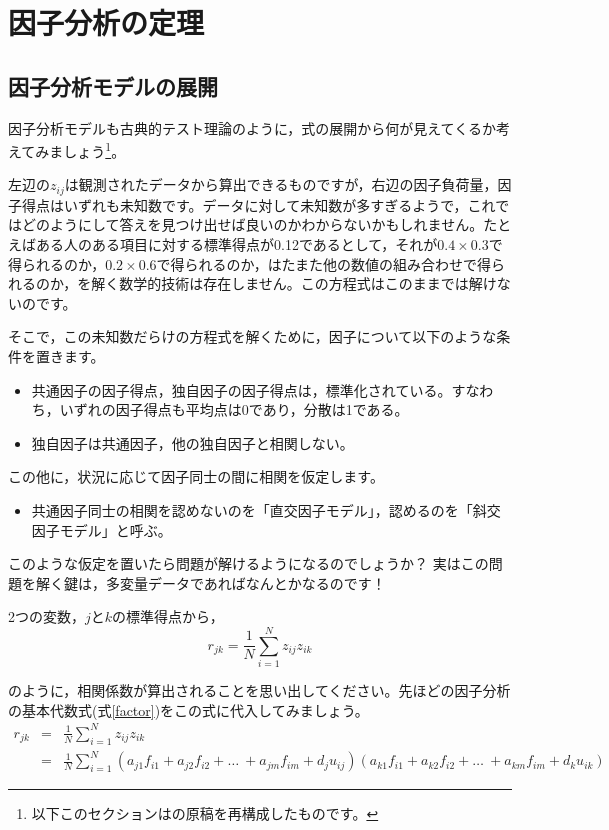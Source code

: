 \documentclass{ltjsbook}
\begin{document}
\section{因子分析の定理}
\subsection{因子分析モデルの展開}
因子分析モデルも古典的テスト理論のように，式の展開から何が見えてくるか考えてみましょう\footnote{以下このセクションは\textcite{kosugi2018}の原稿を再構成したものです。}。

左辺の$z_{ij}$は観測されたデータから算出できるものですが，右辺の因子負荷量，因子得点はいずれも未知数です。データに対して未知数が多すぎるようで，これではどのようにして答えを見つけ出せば良いのかわからないかもしれません。たとえばある人のある項目に対する標準得点が0.12であるとして，それが$0.4 \times 0.3$で得られるのか，$0.2 \times 0.6$で得られるのか，はたまた他の数値の組み合わせで得られるのか，を解く数学的技術は存在しません。この方程式はこのままでは解けないのです。

そこで，この未知数だらけの方程式を解くために，因子について以下のような条件を置きます。
\begin{itemize}
	\item 共通因子の因子得点，独自因子の因子得点は，標準化されている。すなわち，いずれの因子得点も平均点は0であり，分散は1である。
	\item 独自因子は共通因子，他の独自因子と相関しない。
\end{itemize}
この他に，状況に応じて因子同士の間に相関を仮定します。
\begin{itemize}
	\item 共通因子同士の相関を認めないのを「直交因子モデル」，認めるのを「斜交因子モデル」と呼ぶ。
\end{itemize}

このような仮定を置いたら問題が解けるようになるのでしょうか？ 実はこの問題を解く鍵は，多変量データであればなんとかなるのです！

2つの変数，$j$と$k$の標準得点から，
\begin{equation}
	r_{jk}=\frac{1}{N} \sum_{i=1}^{N} z_{ij}z_{ik}
\end{equation}

のように，相関係数が算出されることを思い出してください。先ほどの因子分析の基本代数式(式\ref{factor})をこの式に代入してみましょう。
\begin{equation}
	\begin{array}{ccl}
		r_{jk} & = & \displaystyle{\frac{1}{N} \sum_{i=1}^{N} z_{ij}z_{ik}}                                                                                                                  \\
		       & = & \displaystyle{\frac{1}{N} \sum_{i=1}^{N}}(a_{j1}f_{i1}+a_{j2}f_{i2}+ \ldots \ +a_{jm}f_{im}+d_{j}u_{ij})(a_{k1}f_{i1}+a_{k2}f_{i2}+ \ldots \ +a_{km}f_{im}+d_{k}u_{ik})
	\end{array}
\end{equation}
\end{document}
